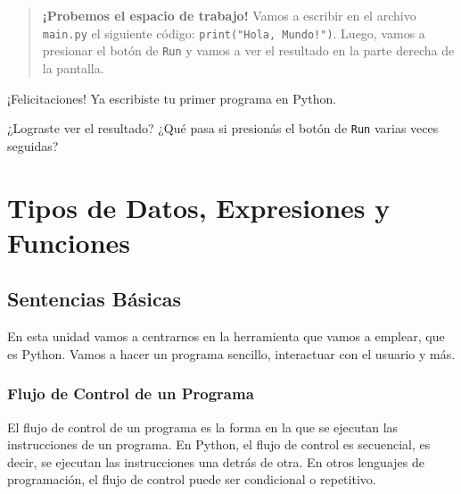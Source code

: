 \documentclass[
  letterpaper,
  DIV=11,
  numbers=noendperiod]{scrreprt}
\begin{document}
\begin{quote}
\textbf{¡Probemos el espacio de trabajo!} Vamos a escribir en el archivo
\texttt{main.py} el siguiente código: \texttt{print("Hola,\ Mundo!")}.
Luego, vamos a presionar el botón de \texttt{Run} y vamos a ver el
resultado en la parte derecha de la pantalla.
\end{quote}

¡Felicitaciones! Ya escribiste tu primer programa en Python.

\begin{tcolorbox}[enhanced jigsaw, colframe=quarto-callout-note-color-frame, opacityback=0, opacitybacktitle=0.6, bottomrule=.15mm, toprule=.15mm, coltitle=black, breakable, colback=white, leftrule=.75mm, titlerule=0mm, bottomtitle=1mm, toptitle=1mm, rightrule=.15mm, title=\textcolor{quarto-callout-note-color}{\faInfo}\hspace{0.5em}{}, arc=.35mm, left=2mm, colbacktitle=quarto-callout-note-color!10!white]

¿Lograste ver el resultado? ¿Qué pasa si presionás el botón de
\texttt{Run} varias veces seguidas?\\

\end{tcolorbox}


\hypertarget{tipos-de-datos-expresiones-y-funciones}{%
\chapter{Tipos de Datos, Expresiones y
Funciones}\label{tipos-de-datos-expresiones-y-funciones}}

\hypertarget{sentencias-buxe1sicas}{%
\section{Sentencias Básicas}\label{sentencias-buxe1sicas}}

En esta unidad vamos a centrarnos en la herramienta que vamos a emplear,
que es Python. Vamos a hacer un programa sencillo, interactuar con el
usuario y más.

\hypertarget{flujo-de-control-de-un-programa}{%
\subsection{Flujo de Control de un
Programa}\label{flujo-de-control-de-un-programa}}

El flujo de control de un programa es la forma en la que se ejecutan las
instrucciones de un programa. En Python, el flujo de control es
secuencial, es decir, se ejecutan las instrucciones una detrás de otra.
En otros lenguajes de programación, el flujo de control puede ser
condicional o repetitivo.
\end{document}
